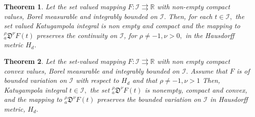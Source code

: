 \documentclass[10pt,a4paper]{amsart}
\newtheorem{theorem}{Theorem}
\begin{document}
 \begin{theorem} \label{compact,continuity}
    Let the set valued mapping $F:\mathcal{I} \rightrightarrows \mathbb{R}$ with non-empty compact values, Borel measurable and integrably bounded on $\mathcal{I}.$ Then, for each $t\in \mathcal{I},$ the set valued Katugampola integral is non empty and compact and the mapping  to $_a^\rho\mathfrak{D}^\nu F(t)$ preserves the continuity on $\mathcal{I}$, for $\rho \neq -1, \nu >0,$ in the Hausdorff metric $H_d$. 
\end{theorem}

 \begin{theorem} \label{BoundVar}
     Let the set-valued mapping $F:\mathcal{I} \rightrightarrows \mathbb{R} $ with non empty compact convex values, Borel measurable and integrably bounded on $\mathcal{I}.$ Assume that $F$ is of bounded variation on $\mathcal{I}$ with respect to $H_d$ and that $\rho \neq -1, \nu >1$ Then, Katugampola integral $t\in \mathcal{I},$ the set $_a^\rho\mathfrak{D}^\nu F(t)$ is nonempty, compact and convex, and the mapping  to $_a^\rho\mathfrak{D}^\nu F(t)$ preserves the bounded variation on $\mathcal{I}$ in Hausdorff metric, $H_d.$
 \end{theorem}
\end{document}
